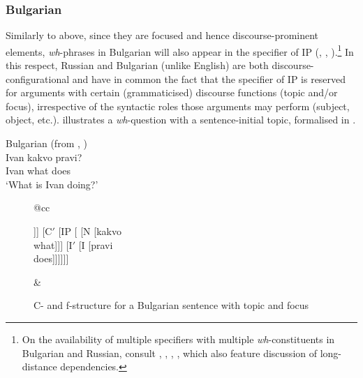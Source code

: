 \documentclass[output=paper,hidelinks]{langscibook}
\begin{document}
\subsubsection{Bulgarian}
\label{sec:Slavic:2.4.2}

Similarly to  above, since they are focused and hence discourse-prom\-i\-nent elements, \textit{wh}{}-phrases in Bulgarian will also appear in the specifier of IP (\citealt{Rudin1985}, \citealt{Izvorski1993}, \citealt[73]{dalrymple01}).\footnote{On the availability of multiple specifiers with multiple \textit{wh}-constituents in Bulgarian and Russian, consult \citet[94ff.]{Rudin1985}, \citet[57]{dalrymple01}, \citet[209--210]{JaegerGerassimova2002}, \citet[98, 677--678, 694--696]{DLM:LFG}, which also feature discussion of long-distance dependencies.} In this respect, Russian and Bulgarian (unlike English) are both discourse-configurational and have in common the fact that the specifier of IP is reserved for arguments with certain (grammaticised) discourse functions (topic and/or focus), irrespective of the syntactic roles those arguments may perform (subject, object, etc.).  illustrates a \textit{wh}{}-question with a sentence-initial topic, formalised in .

\ea Bulgarian (from \citealt[73]{dalrymple01}, \citealt[124]{DLM:LFG})\\%
    \label{ex:Slavic:13}
    \gll Ivan   kakvo   pravi?\\
        Ivan   what   does\\
    \glt `What is Ivan doing?'
    \z

           

\begin{figure}
\begin{tabular}[t]{@{}cc}
{\begin{forest}
    [CP [\rnode{npi}{NP} [N [ {Ivan\\Ivan}]]]
      [C$'$ [IP [ [N [{kakvo\\what}]]]
          [I$'$ [I [{pravi\\does}]]]]]]
\end{forest}} & 
{}
\end{tabular}
\caption{C- and f-structure for a Bulgarian sentence with topic and focus}
\label{fig:Slavic:3}
\end{figure}
\end{document}
